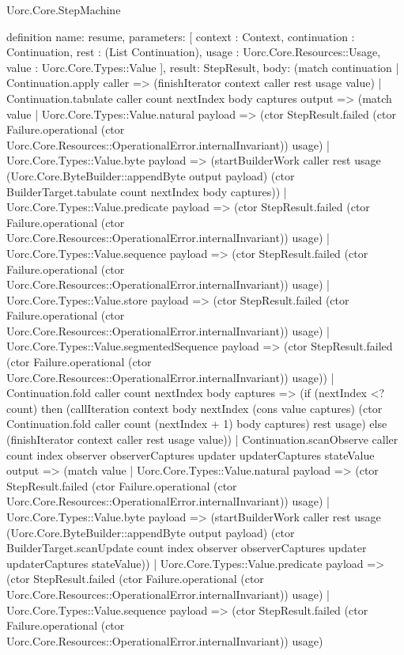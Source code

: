 \begin{lexlean}{Uorc.Core.StepMachine}
\begin{semanticmodule}
definition{
  name: resume,
  parameters: [
    context : Context,
    continuation : Continuation,
    rest : (List Continuation),
    usage : Uorc.Core.Resources::Usage,
    value : Uorc.Core.Types::Value
  ],
  result: StepResult,
  body: (match continuation
    | Continuation.apply caller => (finishIterator context caller rest usage value)
    | Continuation.tabulate caller count nextIndex body captures output => (match value
      | Uorc.Core.Types::Value.natural payload => (ctor StepResult.failed (ctor Failure.operational (ctor Uorc.Core.Resources::OperationalError.internalInvariant)) usage)
      | Uorc.Core.Types::Value.byte payload => (startBuilderWork caller rest usage (Uorc.Core.ByteBuilder::appendByte output payload) (ctor BuilderTarget.tabulate count nextIndex body captures))
      | Uorc.Core.Types::Value.predicate payload => (ctor StepResult.failed (ctor Failure.operational (ctor Uorc.Core.Resources::OperationalError.internalInvariant)) usage)
      | Uorc.Core.Types::Value.sequence payload => (ctor StepResult.failed (ctor Failure.operational (ctor Uorc.Core.Resources::OperationalError.internalInvariant)) usage)
      | Uorc.Core.Types::Value.store payload => (ctor StepResult.failed (ctor Failure.operational (ctor Uorc.Core.Resources::OperationalError.internalInvariant)) usage)
      | Uorc.Core.Types::Value.segmentedSequence payload => (ctor StepResult.failed (ctor Failure.operational (ctor Uorc.Core.Resources::OperationalError.internalInvariant)) usage))
    | Continuation.fold caller count nextIndex body captures => (if (nextIndex <? count) then (callIteration context body nextIndex (cons value captures) (ctor Continuation.fold caller count (nextIndex + 1) body captures) rest usage) else (finishIterator context caller rest usage value))
    | Continuation.scanObserve caller count index observer observerCaptures updater updaterCaptures stateValue output => (match value
      | Uorc.Core.Types::Value.natural payload => (ctor StepResult.failed (ctor Failure.operational (ctor Uorc.Core.Resources::OperationalError.internalInvariant)) usage)
      | Uorc.Core.Types::Value.byte payload => (startBuilderWork caller rest usage (Uorc.Core.ByteBuilder::appendByte output payload) (ctor BuilderTarget.scanUpdate count index observer observerCaptures updater updaterCaptures stateValue))
      | Uorc.Core.Types::Value.predicate payload => (ctor StepResult.failed (ctor Failure.operational (ctor Uorc.Core.Resources::OperationalError.internalInvariant)) usage)
      | Uorc.Core.Types::Value.sequence payload => (ctor StepResult.failed (ctor Failure.operational (ctor Uorc.Core.Resources::OperationalError.internalInvariant)) usage)
}
\end{semanticmodule}
\end{lexlean}

